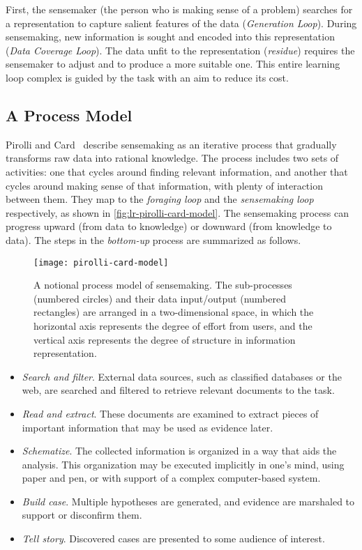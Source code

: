 First, the sensemaker (the person who is making sense of a problem) searches for a representation to capture salient features of the data (\emph{Generation Loop}). During sensemaking, new information is sought and encoded into this representation (\emph{Data Coverage Loop}). The data unfit to the representation (\emph{residue}) requires the sensemaker to adjust and to produce a more suitable one. This entire learning loop complex is guided by the task with an aim to reduce its cost. 

\subsection{A Process Model}
\label{sub:lr-pcm}
Pirolli and Card~\cite{Pirolli2005} describe sensemaking as an iterative process that gradually transforms raw data into rational knowledge. The process includes two sets of activities: one that cycles around finding relevant information, and another that cycles around making sense of that information, with plenty of interaction between them. They map to the \emph{foraging loop} and the \emph{sensemaking loop} respectively, as shown in \autoref{fig:lr-pirolli-card-model}. The sensemaking process can progress upward (from data to knowledge) or downward (from knowledge to data). The steps in the \emph{bottom-up} process are summarized as follows.

\begin{figure}[!htb]
	\centering
	\texttt{[image: pirolli-card-model]}
	\caption[The Pirolli and Card's model of sensemaking]{A notional process model of sensemaking. The sub-processes (numbered circles) and their data input/output (numbered rectangles) are arranged in a two-dimensional space, in which the horizontal axis represents the degree of effort from users, and the vertical axis represents the degree of structure in information representation. }
	\label{fig:lr-pirolli-card-model}
\end{figure}

\begin{itemize}
	\item \emph{Search and filter}. External data sources, such as classified databases or the web, are searched and filtered to retrieve relevant documents to the task.
	\item \emph{Read and extract}. These documents are examined to extract pieces of important information that may be used as evidence later.
	\item \emph{Schematize}.  The collected information is organized in a way that aids the analysis. This organization may be executed implicitly in one's mind, using paper and pen, or with support of a complex computer-based system.
	\item \emph{Build case}. Multiple hypotheses are generated, and evidence are marshaled to support or disconfirm them.
	\item \emph{Tell story}. Discovered cases are presented to some audience of interest.
\end{itemize}

